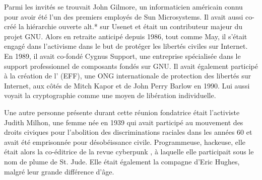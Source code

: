 Parmi les invités se trouvait John Gilmore, un informaticien américain connu pour avoir été l'un des premiers employés de Sun Microsystems. Il avait aussi co-créé la hiérarchie ouverte alt.* sur Usenet et était un contributeur majeur du projet GNU. Alors en retraite anticipé depuis 1986, tout comme May, il s'était engagé dans l'activisme dans le but de protéger les libertés civiles sur Internet. En 1989, il avait co-fondé Cygnus Support, une entreprise spécialisée dans le support professionnel de composants fondés sur GNU. Il avait également participé à la création de l' (EFF), une ONG internationale de protection des libertés sur Internet, aux côtés de Mitch Kapor et de John Perry Barlow en 1990. Lui aussi voyait la cryptographie comme une moyen de libération individuelle. %

Une autre personne présente durant cette réunion fondatrice était l'activiste Judith Milhon, une femme née en 1939 qui avait participé au mouvement des droits civiques pour l'abolition des discriminations raciales dans les années 60 et avait été emprisonnée pour désobéissance civile. Programmeuse, hackeuse, elle était alors la co-éditrice de la revue cyberpunk , à laquelle elle participait sous le nom de plume de St. Jude. Elle était également la compagne d'Eric Hughes, malgré leur grande différence d'âge.

